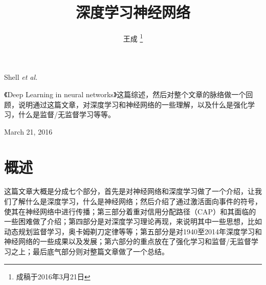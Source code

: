 \documentclass[10pt,journal,compsoc]{IEEEtran}
\begin{document}
\title{深度学习神经网络}

\author{王成        
\thanks{成稿于2016年3月21日}}


%
{Shell \MakeLowercase{\textit{et al.}}}





\maketitle



\IEEEdisplaynontitleabstractindextext

\IEEEpeerreviewmaketitle




\IEEEPARstart { }《Deep Learning in neural networks》这篇综述，然后对整个文章的脉络做一个回顾，说明通过这篇文章，对深度学习和神经网络的一些理解，以及什么是强化学习，什么是监督/无监督学习等等。

 
\hfill March 21, 2016

\section{概述}这篇文章大概是分成七个部分，首先是对神经网络和深度学习做了一个介绍，让我们了解什么是深度学习，什么是神经网络；然后介绍了通过激活面向事件的符号，使其在神经网络中进行传播；第三部分着重对信用分配路径（CAP）和其面临的一些困难做了介绍；第四部分是对深度学习理论再现，来说明其中一些思想，比如动态规划监督学习，奥卡姆剃刀定律等等；第五部分是对1940至2014年深度学习和神经网络的一些成果以及发展；第六部分的重点放在了强化学习和监督/无监督学习之上；最后底气部分则对整篇文章做了一个总结。
\end{document}
